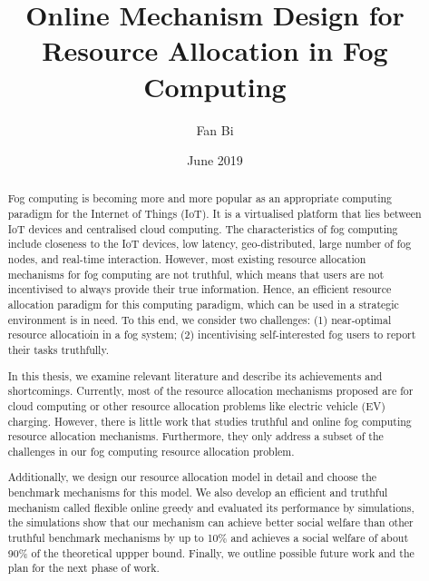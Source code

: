 \documentclass[11pt]{phdthesis}
\begin{document}
\sloppy %
\frontmatter
\title      {Online Mechanism Design for Resource Allocation in Fog Computing}
\date       {June 2019}
\author     {Fan Bi}

\maketitle

\begin{abstract}
  Fog computing is becoming more and more popular as an appropriate computing paradigm for the Internet of Things (IoT). It is a virtualised platform that lies between IoT devices and centralised cloud computing. The characteristics of fog computing include closeness to the IoT devices, low latency, geo-distributed,  large number of fog nodes, and real-time interaction. However, most existing resource allocation mechanisms for fog computing are not truthful, which means that users are not incentivised to always provide their true information. Hence, an efficient resource allocation paradigm for this computing paradigm, which can be used in a strategic environment is in need. To this end, we consider two challenges: (1) near-optimal resource allocatioin in a fog system; (2) incentivising self-interested fog users to report their tasks truthfully. 

In this thesis, we examine relevant literature and describe its achievements and shortcomings. Currently, most of the resource allocation mechanisms proposed are for cloud computing or other resource allocation problems like electric vehicle (EV) charging. However, there is little work that studies truthful and online fog computing resource allocation mechanisms. Furthermore, they only address a subset of the challenges in our fog computing resource allocation problem. 

Additionally, we design our resource allocation model in detail and choose the benchmark mechanisms for this model. We also develop an efficient and truthful mechanism called flexible online greedy and evaluated its performance by simulations, the simulations show that our mechanism can achieve better social welfare than other truthful benchmark mechanisms by up to 10\% and achieves a social welfare of about 90\% of the theoretical uppper bound. Finally, we outline possible future work and the plan for the next phase of work.
\end{abstract}
\end{document}
